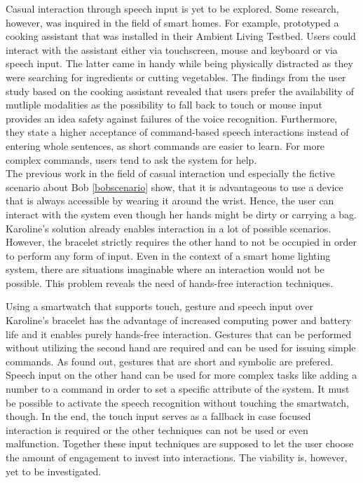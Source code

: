 Casual interaction through speech input is yet to be explored. Some research, however, was inquired in the field of smart homes. For example, \cite{blumendorf2008multimodal} prototyped a cooking assistant that was installed in their Ambient Living Testbed. Users could interact with the assistant either via touchscreen, mouse and keyboard or via speech input. The latter came in handy while being physically distracted as they were searching for ingredients or cutting vegetables. The findings from the user study based on the cooking assistant revealed that users prefer the availability of mutliple modalities as the possibility to fall back to touch or mouse input provides an idea safety against failures of the voice recognition. Furthermore, they state a higher acceptance of command-based speech interactions instead of entering whole sentences, as short commands are easier to learn. For more complex commands, users tend to ask the system for help.\\

The previous work in the field of casual interaction und especially the fictive scenario about Bob \ref{bobscenario} show, that it is advantageous to use a device that is always accessible by wearing it around the wrist. Hence, the user can interact with the system even though her hands might be dirty or carrying a bag. Karoline's solution \cite{Busse2014Thesis} already enables interaction in a lot of possible scenarios. However, the bracelet strictly requires the other hand to not be occupied in order to perform any form of input. Even in the context of a smart home lighting system, there are situations imaginable where an interaction would not be possible. This problem reveals the need of hands-free interaction techniques. 

Using a smartwatch that supports touch, gesture and speech input over Karoline's bracelet \cite{Busse2014Thesis} has the advantage of increased computing power and battery life and it enables purely hands-free interaction. Gestures that can be performed without utilizing the second hand are required and can be used for issuing simple commands. As \cite{kuhnel2011m} found out, gestures that are short and symbolic are prefered. Speech input on the other hand can be used for more complex tasks like adding a number to a command in order to set a specific attribute of the system. It must be possible to activate the speech recognition without touching the smartwatch, though. In the end, the touch input serves as a fallback in case focused interaction is required or the other techniques can not be used or even malfunction. Together these input techniques are supposed to let the user choose the amount of engagement to invest into interactions. The viability is, however, yet to be investigated.







